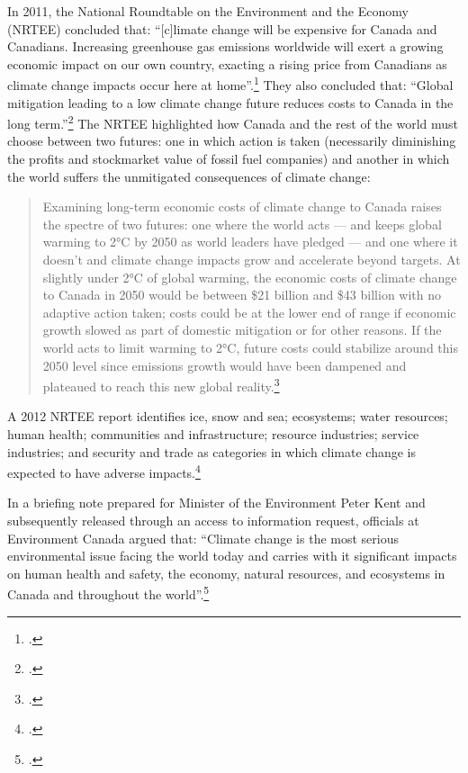 In 2011, the National Roundtable on the Environment and the Economy (NRTEE) concluded that: ``[c]limate change will be expensive for Canada and Canadians. Increasing greenhouse gas emissions worldwide will exert a growing economic impact on our own country, exacting a rising price from Canadians as climate change impacts occur here at home''.\footcite[][p.15]{NRTEEPrice}
They also concluded that: ``Global mitigation leading to a low climate change future reduces costs to Canada in the long term.''\footcite[][p.16]{NRTEEPrice}
The NRTEE highlighted how Canada and the rest of the world must choose between two futures: one in which action is taken (necessarily diminishing the profits and stockmarket value of fossil fuel companies) and another in which the world suffers the unmitigated consequences of climate change:
\begin{quote}
Examining long-term economic costs of climate change to Canada raises the spectre of two futures: one where the world acts — and keeps global warming to 2°C by 2050 as world leaders have pledged — and one where it doesn't and climate change impacts grow and accelerate beyond targets. At slightly under 2°C of global warming, the economic costs of climate change to Canada in 2050 would be between \$21 billion and \$43 billion with no adaptive action taken; costs could be at the lower end of range if economic growth slowed as part of domestic mitigation or for other reasons. If the world acts to limit warming to 2°C, future costs could stabilize around this 2050 level since emissions growth would have been dampened and plateaued to reach this new global reality.\footcite[][p.18]{NRTEEPrice}
\end{quote}
A 2012 NRTEE report identifies ice, snow and sea; ecosystems; water resources; human health; communities and infrastructure; resource industries; service industries; and security and trade as categories in which climate change is expected to have adverse impacts.\footcite[][p. 41]{DegreesOfChange}



In a briefing note prepared for Minister of the Environment Peter Kent and subsequently released through an access to information request, officials at Environment Canada argued that: ``Climate change is the most serious environmental issue facing the world today and carries with it significant impacts on human health and safety, the economy, natural resources, and ecosystems in Canada and throughout the world''.\footcite[][]{BureaucratsUrged}



